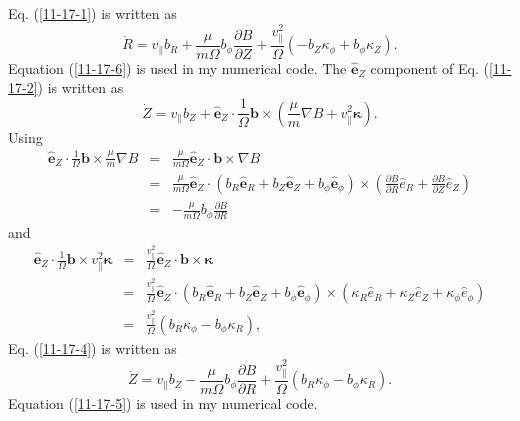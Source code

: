 \documentclass{article}
\begin{document}
Eq. (\ref{11-17-1}) is written as
\begin{equation}
  \label{11-17-6} \dot{R} = v_{\parallel} b_R + \frac{\mu}{m \Omega} b_{\phi} 
  \frac{\partial B}{\partial Z} + \frac{v_{\parallel}^2}{\Omega} (- b_Z
  \kappa_{\phi} + b_{\phi} \kappa_Z) .
\end{equation}
Equation (\ref{11-17-6}) is used in my numerical code. The
$\hat{\mathbf{e}}_Z$ component of Eq. (\ref{11-17-2}) is written as
\begin{equation}
  \label{11-17-4} \dot{Z} = v_{\parallel} b_Z + \hat{\mathbf{e}}_Z \cdot
  \frac{1}{\Omega} \mathbf{b} \times \left( \frac{\mu}{m} \nabla B +
  v_{\parallel}^2 \mathbf{\kappa} \right) .
\end{equation}
Using
\begin{eqnarray}
  \hat{\mathbf{e}}_Z \cdot \frac{1}{\Omega} \mathbf{b} \times \frac{\mu}{m}
  \nabla B & = & \frac{\mu}{m \Omega} \hat{\mathbf{e}}_Z \cdot \mathbf{b}
  \times \nabla B \nonumber\\
  & = & \frac{\mu}{m \Omega} \hat{\mathbf{e}}_Z \cdot (b_R \hat{\mathbf{e}}_R
  + b_Z \hat{\mathbf{e}}_Z + b_{\phi} \hat{\mathbf{e}}_{\phi}) \times \left(
  \frac{\partial B}{\partial R} \hat{e}_R + \frac{\partial B}{\partial Z}
  \hat{e}_Z \right) \nonumber\\
  & = & - \frac{\mu}{m \Omega} b_{\phi}  \frac{\partial B}{\partial R} 
\end{eqnarray}
and
\begin{eqnarray}
  \hat{\mathbf{e}}_Z \cdot \frac{1}{\Omega} \mathbf{b} \times v_{\parallel}^2
  \mathbf{\kappa} & = & \frac{v_{\parallel}^2}{\Omega} \hat{\mathbf{e}}_Z
  \cdot \mathbf{b} \times \mathbf{\kappa} \nonumber\\
  & = & \frac{v_{\parallel}^2}{\Omega} \hat{\mathbf{e}}_Z \cdot (b_R
  \hat{\mathbf{e}}_R + b_Z \hat{\mathbf{e}}_Z + b_{\phi}
  \hat{\mathbf{e}}_{\phi}) \times (\kappa_R \hat{e}_R + \kappa_Z \hat{e}_Z +
  \kappa_{\phi} \hat{e}_{\phi}) \nonumber\\
  & = & \frac{v_{\parallel}^2}{\Omega} (b_R \kappa_{\phi} - b_{\phi}
  \kappa_R), 
\end{eqnarray}
Eq. (\ref{11-17-4}) is written as
\begin{equation}
  \label{11-17-5} \dot{Z} = v_{\parallel} b_Z - \frac{\mu}{m \Omega} b_{\phi} 
  \frac{\partial B}{\partial R} + \frac{v_{\parallel}^2}{\Omega} (b_R
  \kappa_{\phi} - b_{\phi} \kappa_R) .
\end{equation}
Equation (\ref{11-17-5}) is used in my numerical code.
\end{document}
